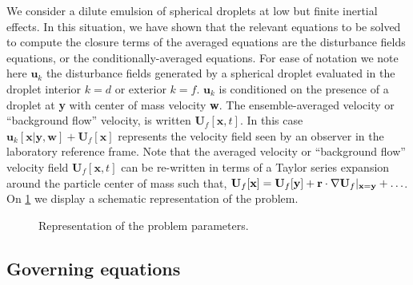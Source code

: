 We consider a dilute emulsion of spherical droplets at low but finite inertial effects. 
In this situation, we have shown that the relevant equations to be solved to compute the closure terms of the averaged equations are the disturbance fields equations, or the conditionally-averaged equations. 
For ease of notation we note here $\textbf{u}_k$ the disturbance fields generated by a spherical droplet evaluated in the droplet interior $k = d$ or exterior $k=f$. 
$\textbf{u}_k$ is conditioned on the presence of a droplet at \textbf{y} with center of mass velocity \textbf{w}.
The ensemble-averaged velocity or ``background flow'' velocity, is written $\textbf{U}_f[\textbf{x},t]$. 
In this case $\textbf{u}_k[\textbf{x}|\textbf{y},\textbf{w}] + \textbf{U}_f[\textbf{x}]$ represents the velocity field seen by an observer in the laboratory reference frame.
Note that the averaged velocity or ``background flow'' velocity field $\textbf{U}_f[\textbf{x},t]$ can be re-written in terms of a Taylor series expansion around the particle center of mass such that, $\textbf{U}_f[\textbf{x}] = \textbf{U}_f[\textbf{y}] + \textbf{r} \cdot \mathbf{\nabla} \textbf{U}_f|_{\textbf{x} =\textbf{y}} + \ldots$. 
On \ref{fig:disturbance} we display a schematic representation of the problem. 
\begin{figure}
    \centering
    \caption{Representation of the problem parameters.}
    \label{fig:disturbance}
\end{figure}

\subsection{Governing equations}

